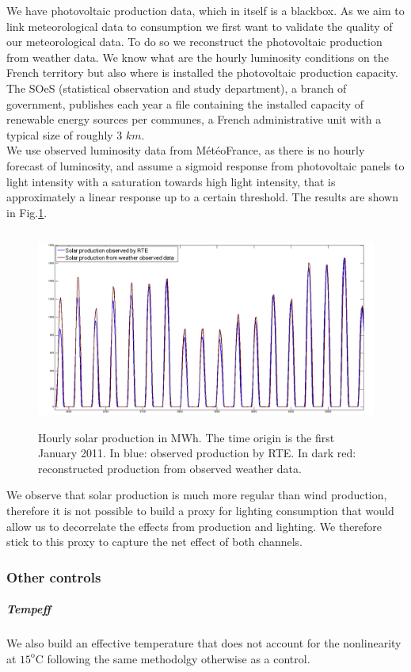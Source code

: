 We have photovoltaic production data, which in itself is a blackbox. As we aim to link meteorological data to consumption we first want to validate the quality of our meteorological data. To do so we reconstruct the photovoltaic production from weather data. We know what are the hourly luminosity conditions on the French territory but also where is installed the photovoltaic production capacity. The SOeS (statistical observation and study department), a branch of government, publishes each year a file containing the installed capacity of renewable energy sources per communes, a French administrative unit with a typical size of roughly 3 $km$. \\

We use observed luminosity data from M\'{e}t\'{e}oFrance, as there is no hourly forecast of luminosity, and assume a sigmoid response from photovoltaic panels to light intensity with a saturation towards high light intensity, that is approximately a linear response up to a certain threshold. The results are shown in Fig.\ref{solarreco}.  \\

\begin{figure}[!ht]
\centering
\includegraphics[height=65mm]{forqgis/solobs_reco.png} 
\caption{Hourly solar production in MWh. The time origin is the first January 2011. In blue: observed production by RTE. In dark red: reconstructed production from observed weather data.}
\label{solarreco}
\end{figure}


We observe that solar production is much more regular than wind production, therefore it is not possible to build a proxy for lighting consumption that would allow us to decorrelate the effects from production and lighting. We therefore stick to this proxy to capture the net effect of both channels.

\subsubsection{Other controls}
\subparagraph{Tempeff}
We also build an effective temperature that does not account for the nonlinearity at $15^\text{o}$C following the same methodolgy otherwise as a control. 


